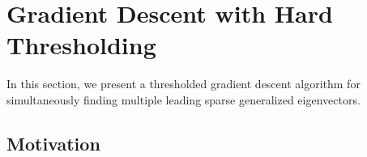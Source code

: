 \documentclass[11pt]{article}
\newcommand{\0}{{\mathbf{0}}}
\begin{document}
\fi


\section{Gradient Descent with Hard Thresholding}
\label{sec:alg}

In this section, we present a thresholded gradient descent algorithm for simultaneously finding multiple leading sparse generalized eigenvectors. 


\subsection{Motivation}
\end{document}

